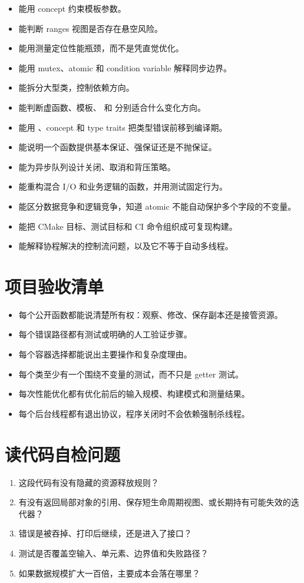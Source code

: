 \begin{itemize}
  \item 能用 concept 约束模板参数。
  \item 能判断 ranges 视图是否存在悬空风险。
  \item 能用测量定位性能瓶颈，而不是凭直觉优化。
  \item 能用 mutex、atomic 和 condition variable 解释同步边界。
  \item 能拆分大型类，控制依赖方向。
  \item 能判断虚函数、模板、 和  分别适合什么变化方向。
  \item 能用 、concept 和 type traits 把类型错误前移到编译期。
  \item 能说明一个函数提供基本保证、强保证还是不抛保证。
  \item 能为异步队列设计关闭、取消和背压策略。
  \item 能重构混合 I/O 和业务逻辑的函数，并用测试固定行为。
  \item 能区分数据竞争和逻辑竞争，知道 atomic 不能自动保护多个字段的不变量。
  \item 能把 CMake 目标、测试目标和 CI 命令组织成可复现构建。
  \item 能解释协程解决的控制流问题，以及它不等于自动多线程。
\end{itemize}

\section{项目验收清单}

\begin{itemize}
  \item 每个公开函数都能说清楚所有权：观察、修改、保存副本还是接管资源。
  \item 每个错误路径都有测试或明确的人工验证步骤。
  \item 每个容器选择都能说出主要操作和复杂度理由。
  \item 每个类至少有一个围绕不变量的测试，而不只是 getter 测试。
  \item 每次性能优化都有优化前后的输入规模、构建模式和测量结果。
  \item 每个后台线程都有退出协议，程序关闭时不会依赖强制杀线程。
\end{itemize}

\section{读代码自检问题}

\begin{enumerate}
  \item 这段代码有没有隐藏的资源释放规则？
  \item 有没有返回局部对象的引用、保存短生命周期视图、或长期持有可能失效的迭代器？
  \item 错误是被吞掉、打印后继续，还是进入了接口？
  \item 测试是否覆盖空输入、单元素、边界值和失败路径？
  \item 如果数据规模扩大一百倍，主要成本会落在哪里？
\end{enumerate}
